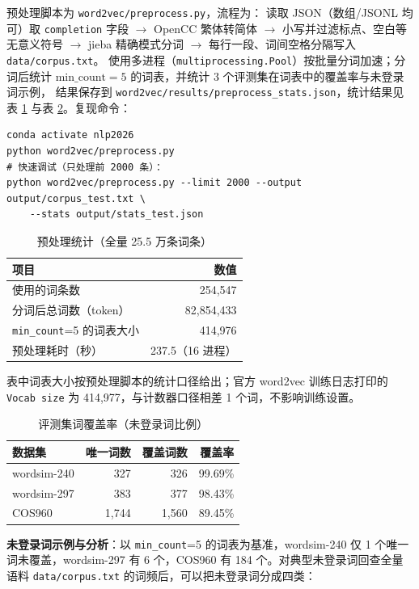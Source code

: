 \documentclass[11pt,a4paper]{article}
\begin{document}
预处理脚本为 \texttt{word2vec/preprocess.py}，流程为：
读取 JSON（数组/JSONL 均可）取 \texttt{completion} 字段 $\to$ OpenCC 繁体转简体
$\to$ 小写并过滤标点、空白等无意义符号 $\to$ jieba 精确模式分词
$\to$ 每行一段、词间空格分隔写入 \texttt{data/corpus.txt}。
使用多进程（\texttt{multiprocessing.Pool}）按批量分词加速；分词后统计
$\text{min\_count}=5$ 的词表，并统计 3 个评测集在词表中的覆盖率与未登录词示例，
结果保存到 \texttt{word2vec/results/preprocess\_stats.json}，统计结果见表
\ref{tab:preprocess} 与表 \ref{tab:coverage}。复现命令：

\begin{verbatim}
conda activate nlp2026
python word2vec/preprocess.py
# 快速调试（只处理前 2000 条）：
python word2vec/preprocess.py --limit 2000 --output output/corpus_test.txt \
    --stats output/stats_test.json
\end{verbatim}

\begin{table}[htbp]
\centering
\caption{预处理统计（全量 25.5 万条词条）}
\label{tab:preprocess}
\begin{tabular}{lr}
\toprule
项目 & 数值 \\
\midrule
使用的词条数 & 254{,}547 \\
分词后总词数（token） & 82{,}854{,}433 \\
\texttt{min\_count}=5 的词表大小 & 414{,}976 \\
预处理耗时（秒） & 237.5（16 进程） \\
\bottomrule
\end{tabular}
\end{table}

表中词表大小按预处理脚本的统计口径给出；官方 word2vec 训练日志打印的
\texttt{Vocab size} 为 414{,}977，与计数器口径相差 1 个词，不影响训练设置。

\begin{table}[htbp]
\centering
\caption{评测集词覆盖率（未登录词比例）}
\label{tab:coverage}
\begin{tabular}{lrrr}
\toprule
数据集 & 唯一词数 & 覆盖词数 & 覆盖率 \\
\midrule
wordsim-240 & 327 & 326 & 99.69\% \\
wordsim-297 & 383 & 377 & 98.43\% \\
COS960 & 1{,}744 & 1{,}560 & 89.45\% \\
\bottomrule
\end{tabular}
\end{table}

\textbf{未登录词示例与分析}：以 \texttt{min\_count}=5 的词表为基准，wordsim-240 仅
1 个唯一词未覆盖，wordsim-297 有 6 个，COS960 有 184 个。对典型未登录词回查全量语料
\texttt{data/corpus.txt} 的词频后，可以把未登录词分成四类：
\end{document}
